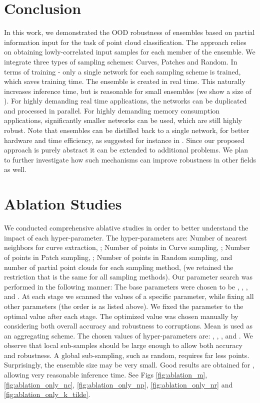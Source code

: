 \documentclass[10pt,twocolumn]{article}
\begin{document}
\section{Conclusion}
\label{sec:conc}
In this work, we demonstrated the OOD robustness of ensembles based on partial information input for the task of point cloud classification. The approach relies on obtaining lowly-correlated input samples for each member of the ensemble. We integrate three types of sampling schemes: Curves, Patches and Random. In terms of training - only a single network for each sampling scheme is trained, which  saves training time. The ensemble is created in real time. This naturally increases inference time, but is reasonable for small ensembles (we show a size of ). For highly demanding real time applications, the networks can be duplicated and processed in parallel. For highly demanding memory consumption applications, significantly smaller networks can be used, which are still highly robust.
Note that ensembles can be distilled back to a single network, for better hardware and time efficiency, as suggested for instance in \cite{shen2019meal}.
Since our proposed approach is purely abstract it can be extended to additional problems. We plan to further investigate how such mechanisms can improve robustness in other fields as well.





{\small


}
\pagebreak
\section{Ablation Studies}
We conducted comprehensive ablative studies in order to better understand the impact of each hyper-parameter. The hyper-parameters are: Number of nearest neighbors for curve extraction, \textit{}; Number of points in Curve sampling, \textit{}; Number of points in Patch sampling, \textit{}; Number of points in Random sampling, \textit{} and number of partial point clouds for each sampling method, \textit{} (we retained the restriction that  is the same for all sampling methods).
Our parameter search was performed in the following manner: The base parameters were chosen to be , , ,  and . At each stage we  scanned the values of a specific parameter, while fixing all other parameters (the order is as listed above). 
We fixed the parameter to the optimal value after each stage. The optimized value was chosen manually by considering both overall accuracy and robustness to corruptions. Mean is used as an aggregating scheme.
The chosen values of hyper-parameters are: , , ,  and .
We observe that local sub-samples should be large enough to allow both accuracy and robustness. A global sub-sampling, such as random, requires far less points. Surprisingly, the ensemble size may be very small. Good results are obtained for , allowing very reasonable inference time. 
See Figs \ref{fig:ablation_m}, \ref{fig:ablation_only_nc}, \ref{fig:ablation_only_np}, \ref{fig:ablation_only_nr} and \ref{fig:ablation_only_k_tilde}.
\end{document}
